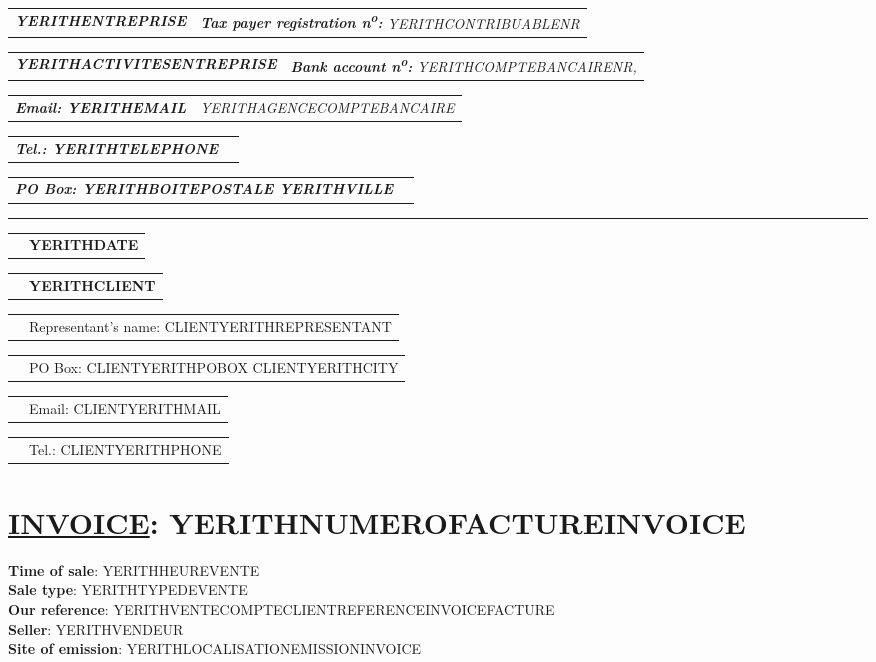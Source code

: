 \documentclass[10pt,YERITHPAPERSPEC]{article} %
\makeatletter
\newcommand{\headerrow}[2]
{\begin{tabular*}{\linewidth}{l@{\extracolsep{\fill}}r}
	#1 &
	#2 \\
\end{tabular*}}
\newcommand{\emphbold}[1]{\textbf{\emph{#1}}\xspace}
\makeatother
\begin{document}
\bigskip

\headerrow
	{\emphbold{YERITHENTREPRISE}}
	{\emph{\textbf{Tax payer registration n\textsuperscript{o}:} YERITHCONTRIBUABLENR}}
\headerrow
	{\emphbold{YERITHACTIVITESENTREPRISE}}
	{\emph{\textbf{Bank account n\textsuperscript{o}:} YERITHCOMPTEBANCAIRENR,}}
\headerrow
	{\emphbold{Email: YERITHEMAIL}}
	{\emph{YERITHAGENCECOMPTEBANCAIRE}}
\headerrow
	{\emphbold{Tel.: YERITHTELEPHONE}}
	{}
\headerrow
	{\emphbold{PO Box: YERITHBOITEPOSTALE YERITHVILLE}}
	{}
	
\hrule

\headerrow
	{}
	{\textbf{YERITHDATE}}

\vspace*{0.9cm}

\headerrow
{}
{\textbf{YERITHCLIENT}}
\headerrow
{}
{Representant's name: CLIENTYERITHREPRESENTANT}
\headerrow
{}
{PO Box: CLIENTYERITHPOBOX CLIENTYERITHCITY}
\headerrow
{}
{Email: CLIENTYERITHMAIL}
\headerrow
{}
{Tel.: CLIENTYERITHPHONE}

\section*{\underline{INVOICE}: YERITHNUMEROFACTUREINVOICE}
\textbf{Time of sale}: YERITHHEUREVENTE\\
\textbf{Sale type}: YERITHTYPEDEVENTE\\
\textbf{Our reference}: YERITHVENTECOMPTECLIENTREFERENCEINVOICEFACTURE\\
\textbf{Seller}: YERITHVENDEUR\\
\textbf{Site of emission}: YERITHLOCALISATIONEMISSIONINVOICE

\vspace{0.3cm} 

\begin{table*}[!htbp]
\end{table*}
\end{document}
